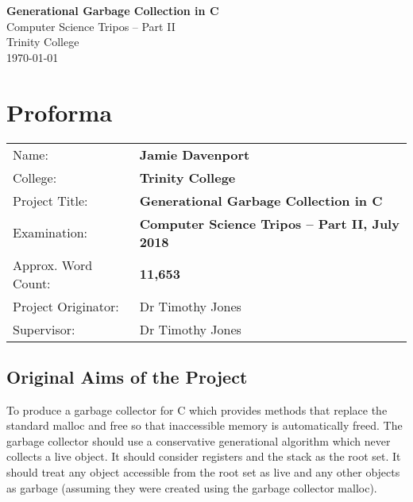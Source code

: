 \documentclass[12pt,a4paper,twoside,openright]{report}
\begin{document}





\pagestyle{empty}


\vspace*{60mm}
\begin{center}
\LARGE
\textbf{Generational Garbage Collection in C} \\[5mm]
Computer Science Tripos -- Part II \\[5mm]
Trinity College \\[5mm]
\today  %
\end{center}


\pagestyle{plain}

\chapter*{Proforma}

{\large
\begin{tabular}{ll}
Name:               & \bf Jamie Davenport                       \\
College:            & \bf Trinity College                     \\
Project Title:      & \bf Generational Garbage Collection in C \\
Examination:        & \bf Computer Science Tripos -- Part II, July 2018  \\
Approx. Word Count:         & \bf 11,653  \\
Project Originator: & Dr Timothy Jones                    \\
Supervisor:         & Dr Timothy Jones                    \\ 
\end{tabular}
}


\section*{Original Aims of the Project}

To produce a garbage collector for C which provides methods that replace the standard malloc and free so that inaccessible memory is automatically freed. The garbage collector should use a conservative generational algorithm which never collects a live object. It should consider registers and the stack as the root set. It should treat any object accessible from the root set as live and any other objects as garbage (assuming they were created using the garbage collector malloc).
\end{document}
